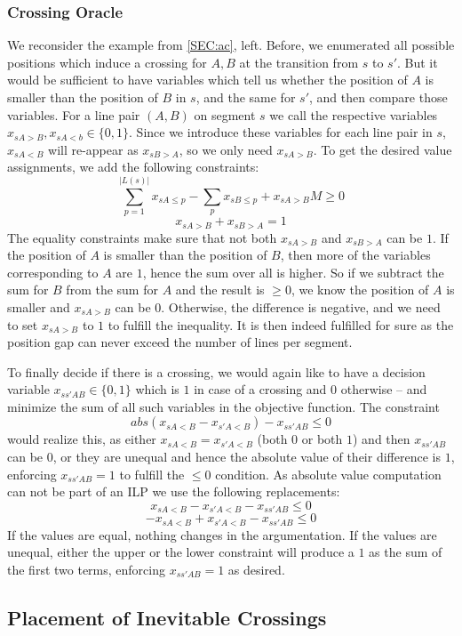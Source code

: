 \documentclass{llncs}
\begin{document}
\subsubsection{Crossing Oracle}
We reconsider the example from \ref{SEC:ac}, left. Before, we enumerated all possible positions which induce a crossing for $A, B$ at the transition from $s$ to $s'$. But it would be sufficient to have variables which tell us whether the position of $A$ is smaller than the position of $B$ in $s$, and the same for $s'$, and then compare those variables. For a line pair $(A,B)$ on segment $s$ we call the respective variables $x_{sA>B}, x_{sA<b} \in \{0, 1\}$. Since we introduce these variables for each line pair in $s$, $x_{sA<B}$ will re-appear as $x_{sB>A}$, so we only need $x_{sA>B}$. To get the desired value assignments, we add the following constraints:
$$\sum_{p=1}^{|L(s)|} x_{sA\leq p} - \sum_{p} x_{sB\leq p} + x_{sA>B} M \geq 0$$
$$x_{sA>B} + x_{sB>A}=1$$
The equality constraints make sure that not both $x_{sA>B}$ and $x_{sB>A}$ can be $1$. If the position of $A$ is smaller than the position of $B$, then more of the variables corresponding to $A$ are $1$, hence the sum over all is higher. So if we subtract the sum for $B$ from the sum for $A$ and the result is $\geq 0$, we know the position of $A$ is  smaller and $x_{sA>B}$ can be $0$. Otherwise, the difference is negative, and we need to set $x_{sA>B}$ to $1$ to fulfill the inequality. It is then indeed fulfilled for sure as the position gap can never exceed the number of lines per segment.

To finally decide if there is a crossing, we would again like to have a decision variable $x_{ss'AB} \in \{0,1\}$ which is $1$ in case of a crossing and $0$ otherwise -- and minimize the sum of all such variables in the objective function. The constraint $$abs(x_{sA<B}-x_{s'A<B}) - x_{ss'AB} \leq 0$$ would realize this, as either $x_{sA<B} = x_{s'A<B}$ (both $0$ or both $1$) and then $x_{ss'AB}$ can be $0$, or they are unequal and hence the absolute value of their difference is $1$, enforcing $x_{ss'AB}=1$ to fulfill the $\leq 0$ condition. As absolute value computation can not be part of an ILP we use the following replacements:
$$x_{sA<B} - x_{s'A<B} - x_{ss'AB} \leq 0$$
$$-x_{sA<B} + x_{s'A<B} - x_{ss'AB} \leq 0$$
If the values are equal, nothing changes in the argumentation. If the values are unequal, either the upper or the lower constraint will produce a $1$ as the sum of the first two terms, enforcing $x_{ss'AB}=1$ as desired.

\subsection{Placement of Inevitable Crossings}
\end{document}
